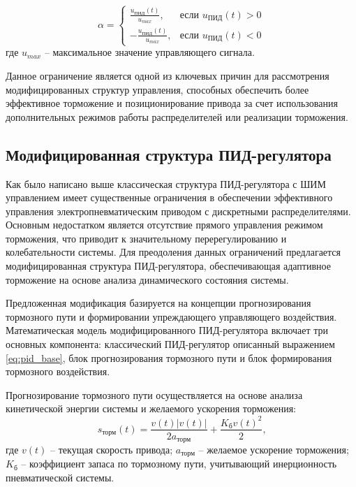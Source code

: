 \begin{equation*}
	\alpha = \begin{cases}
		\frac{u_\text{ПИД}(t)}{u_{max}},  & \text{если } u_\text{ПИД}(t) > 0 \\
		-\frac{u_\text{ПИД}(t)}{u_{max}}, & \text{если } u_\text{ПИД}(t) < 0
	\end{cases}
\end{equation*}
где $u_{max}$ -- максимальное значение управляющего сигнала.

Данное ограничение является одной из ключевых причин для рассмотрения модифицированных
структур управления, способных обеспечить более эффективное торможение и позиционирование
привода за счет использования дополнительных режимов работы распределителей или реализации
торможения.

\subsection{Модифицированная структура ПИД-регулятора}\label{subsec:ch3/sec2/sub3}

Как было написано выше классическая структура ПИД-регулятора с ШИМ управлением имеет существенные ограничения
в обеспечении эффективного управления электропневматическим приводом с дискретными распределителями.
Основным недостатком является отсутствие прямого управления режимом торможения, что приводит к значительному
перерегулированию и колебательности системы. Для преодоления данных ограничений предлагается модифицированная
структура ПИД-регулятора, обеспечивающая адаптивное торможение на основе анализа динамического состояния системы.

Предложенная модификация базируется на концепции прогнозирования тормозного пути и формировании упреждающего
управляющего воздействия. Математическая модель модифицированного ПИД-регулятора включает три основных
компонента: классический ПИД-регулятор описанный выражением \ref{eq:pid_base}, блок прогнозирования тормозного пути
и блок формирования тормозного воздействия.

Прогнозирование тормозного пути осуществляется на основе анализа
кинетической энергии системы и желаемого ускорения торможения:
\begin{equation*}\label{eq:braking_prediction}
	s_{\text{торм}}(t) = \frac{v(t)|v(t)|}{2a_{\text{торм}}} + \frac{K_{\text{б}}v(t)^2}{2}\text{,}
\end{equation*}
где $v(t)$ -- текущая скорость привода;
$a_{\text{торм}}$ -- желаемое ускорение торможения;
$K_{\text{б}}$ -- коэффициент запаса по тормозному пути, учитывающий инерционность пневматической системы.


